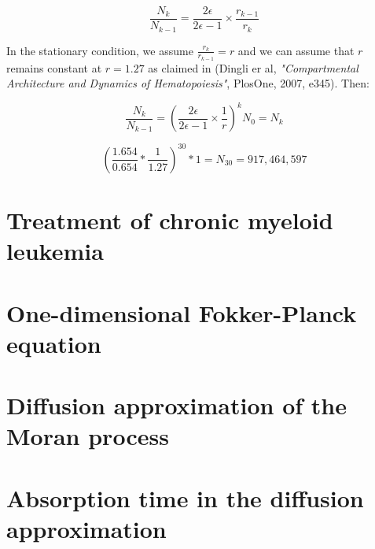 \[ \frac{N_k}{N_{k-1}} = \frac{2\epsilon}{2\epsilon - 1} \times \frac{r_{k-1}}{r_k}\]

In the stationary condition, we assume $\frac{r_k}{r_{k-1}} = r$ and we can assume that $r$ remains constant at $r=1.27$ as claimed in (Dingli er al, \textit{"Compartmental Architecture and Dynamics of Hematopoiesis"}, PlosOne, 2007, e345).
Then:

\[ \frac{N_k}{N_{k-1}} = \left( \frac{2\epsilon}{2\epsilon-1} \times \frac{1}{r} \right)^k N_0 = N_k \]

\[ \left( \frac{1.654}{0.654}*\frac{1}{1.27} \right)^{30} * 1 =  N_{30} = 917,464,597  \]


\setcounter{chapter}{3}
\setcounter{section}{0}
\section{Treatment of chronic myeloid leukemia}

\setcounter{chapter}{4}
\setcounter{section}{0}
\section{One-dimensional Fokker-Planck equation}

\setcounter{chapter}{5}
\setcounter{section}{0}
\section{Diffusion approximation of the Moran process}

\setcounter{chapter}{6}
\setcounter{section}{0}
\section{Absorption time in the diffusion approximation}
